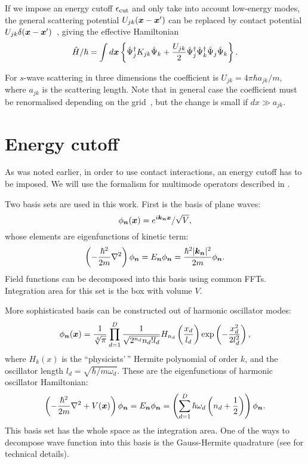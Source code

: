 If we impose an energy cutoff $\epsilon_{\mathrm{cut}}$ and only take into account low-energy modes,
the general scattering potential $U_{jk}(\boldsymbol{x} - \boldsymbol{x}^\prime)$ can be replaced by contact potential $U_{jk} \delta(\boldsymbol{x} - \boldsymbol{x}^\prime)$~\cite{Morgan2000}, giving the effective Hamiltonian
\begin{equation}
\label{eqn:wigner:hamiltonian_effective}
\begin{split}
	\hat{H} / \hbar = \int d\boldsymbol{x} \left\{
		\hat{\Psi}_j^{\dagger} K_{jk} \hat{\Psi}_k
		+ \frac{U_{jk}}{2} \hat{\Psi}_j^\dagger \hat{\Psi}_k^\dagger \hat{\Psi}_j \hat{\Psi}_k
	\right\}.
\end{split}
\end{equation}

For $s$-wave scattering in three dimensions the coefficient is $U_{jk} = 4 \pi \hbar a_{jk} / m$,
where $a_{jk}$ is the scattering length.
Note that in general case the coefficient must be renormalised depending on the grid~\cite{Sinatra2002},
but the change is small if $dx \gg a_{jk}$.


\section{Energy cutoff}

As was noted earlier, in order to use contact interactions, an energy cutoff has to be imposed.
We will use the formalism for multimode operators described in .

Two basis sets are used in this work.
First is the basis of plane waves:
\[
	\phi_{\boldsymbol{n}}(\boldsymbol{x}) = e^{i \boldsymbol{k}_{\boldsymbol{n}} \boldsymbol{x}} / \sqrt{V},
\]
whose elements are eigenfunctions of kinetic term:
\[
	\left( -\frac{\hbar^2}{2m} \nabla^2 \right) \phi_{\boldsymbol{n}}
	= E_{\boldsymbol{n}} \phi_{\boldsymbol{n}}
	= \frac{\hbar^2 \lvert \boldsymbol{k}_{\boldsymbol{n}} \rvert^2}{2 m} \phi_{\boldsymbol{n}}.
\]
Field functions can be decomposed into this basis using common FFTs.
Integration area for this set is the box with volume $V$.

More sophisticated basis can be constructed out of harmonic oscillator modes:
\[
	\phi_{\boldsymbol{n}}(\boldsymbol{x}) = \frac{1}{\sqrt[4]{\pi}}
		\prod\limits_{d=1}^{D}
			\frac{1}{\sqrt{2^{n_d} n_d! l_d}}
			H_{n_d} \left( \frac{x_d}{l_d} \right)
			\exp \left( -\frac{x_d^2}{2 l_d^2} \right),
\]
where $H_k(x)$ is the ``physicists'\,'' Hermite polynomial of order $k$,
and the oscillator length $l_d = \sqrt{\hbar / m \omega_d}$.
These are the eigenfunctions of harmonic oscillator Hamiltonian:
\[
	\left( -\frac{\hbar^2}{2m} \nabla^2 + V(\boldsymbol{x}) \right) \phi_{\boldsymbol{n}}
	= E_{\boldsymbol{n}} \phi_{\boldsymbol{n}}
	= \left(
		\sum\limits_{d=1}^D \hbar \omega_d \left(
			n_d + \frac{1}{2}
		\right)
	\right) \phi_{\boldsymbol{n}}.
\]
This basis set has the whole space as the integration area.
One of the ways to decompose wave function into this basis is the Gauss-Hermite quadrature
(see  for technical details).

